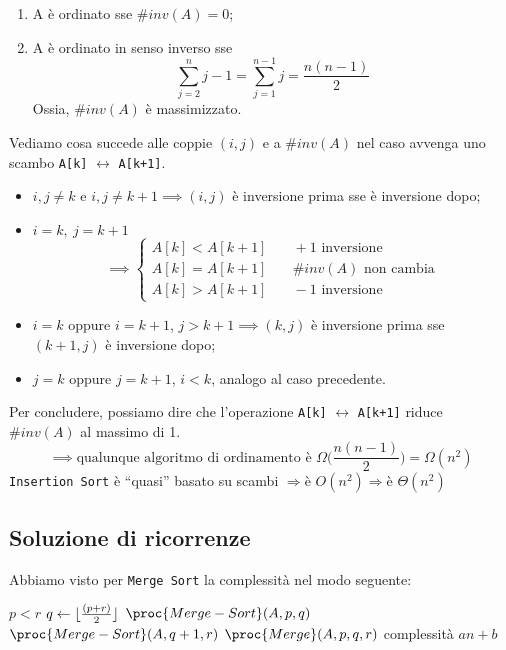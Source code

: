 \begin{enumerate}
	\item A è ordinato sse $\# inv(A) = 0$;
	\item A è ordinato in senso inverso sse 
	\begin{displaymath}
		\displaystyle\sum_{j=2}^{n}j-1 = \displaystyle\sum_{j=1}^{n-1}j = \frac{n(n-1)}{2}
	\end{displaymath}
	Ossia, $\# inv(A)$ è massimizzato.
\end{enumerate}

Vediamo cosa succede alle coppie $(i,j)$ e a $\# inv(A)$ nel caso avvenga uno scambo \texttt{A[k]}
$\leftrightarrow$ \texttt{A[k+1]}.

\begin{itemize}
	\item $i,j \neq k$ e $i,j \neq k+1 \implies (i,j)$ è inversione prima sse è inversione dopo;
	\item $i = k, \ j = k+1$
	\[ \implies
	\begin{cases}
		A[k] < A[k+1] & \quad +1 \text{ inversione} \\
		A[k] = A[k+1] & \quad \# inv(A) \text{ non cambia} \\
		A[k] > A[k+1] & \quad -1 \text{ inversione}
	\end{cases}
	\]
	\item $i = k$ oppure $i = k+1$, $j > k+1 \implies (k,j)$ è inversione prima sse $(k+1,j)$ è
	inversione dopo;
	\item $j = k$ oppure $j = k+1$, $i < k$, analogo al caso precedente.
\end{itemize}

Per concludere, possiamo dire che l'operazione \texttt{A[k]} $\leftrightarrow$ \texttt{A[k+1]}
riduce $\# inv(A)$ al massimo di 1.
\begin{displaymath}
	\implies \text{qualunque algoritmo di ordinamento è } \Omega \Big(\frac{n(n-1)}{2} \Big) = \Omega (n^2)
\end{displaymath}
\texttt{Insertion Sort} è ``quasi'' basato su scambi $\Rightarrow \text{è } O(n^2) \Rightarrow \text{è } \Theta (n^2)$

\subsection{Soluzione di ricorrenze}
Abbiamo visto per \texttt{Merge Sort} la complessità nel modo seguente:

\begin{codebox}
	\li \If $p < r$
	\li     \Then
	$q \gets \lfloor\frac{(p + r)}{2}\rfloor$ 
	\li         $\proc{Merge-Sort}(A,p,q)$
	\li         $\proc{Merge-Sort}(A,q+1,r)$
	\li         $\proc{Merge}(A,p,q,r)$
	\Comment complessità $an + b$
	\End
\end{codebox}

